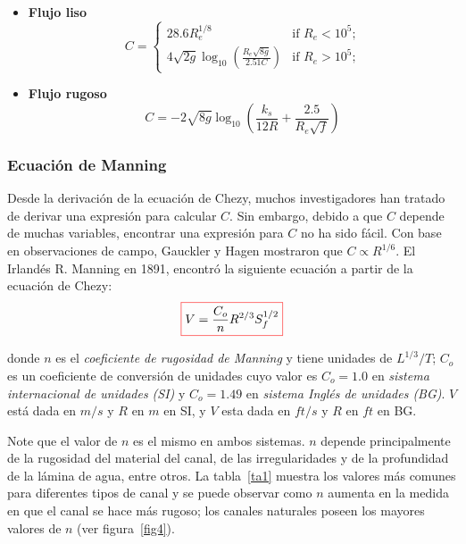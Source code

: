 \documentclass[11pt, oneside]{article}
\begin{document}
\begin{itemize}
\item \textbf{Flujo liso}
\begin{equation}
C = \begin{cases}
28.6 R_e^{1/8} & \text{if $R_e < 10^5$;}\\
4\sqrt{2g}\log_{10} \left( \frac{R_e \sqrt{8g}}{2.51 C}\right) & \text{if $R_e > 10^5$;}
\end{cases}
\label{eq14}
\end{equation}

\item \textbf{Flujo rugoso}
\begin{equation}
C = -2\sqrt{8g}\log_{10} \left(\frac{k_s}{12R} + \frac{2.5}{R_e \sqrt{f}} \right)
\label{eq15}
\end{equation}
\end{itemize}

\subsubsection{Ecuaci\'on de Manning}
Desde la derivaci\'on de la ecuaci\'on de Chezy, muchos investigadores han tratado de derivar una expresi\'on para calcular $C$. Sin embargo, debido a que $C$ depende de muchas variables, encontrar una expresión para $C$ no ha sido fácil. Con base en observaciones de campo, Gauckler y Hagen mostraron que $C \propto R^{1/6}$. El Irlandés R. Manning en 1891, encontró la siguiente ecuaci\'on a partir de la ecuaci\'on de Chezy:
\begin{equation}
\color{red}\boxed{\color{black} V = \frac{C_o }{n} R^{2/3} S_f^{1/2}}
\label{eq16}
\end{equation}

donde $n$ es el \emph{coeficiente de rugosidad de Manning} y tiene unidades de $L^{1/3} /T$; $C_o$ es un coeficiente de conversi\'on de unidades cuyo valor es $C_o = 1.0$ en \emph{sistema internacional de unidades (SI)} y $C_o = 1.49$ en \emph{sistema Ingl\'es de unidades (BG)}. $V$ est\'a dada en $m/s$ y $R$ en $m$ en SI, y $V$ esta dada en $ft/s$ y $R$ en $ft$ en BG.
 
Note que el valor de $n$ es el mismo en ambos sistemas. $n$ depende principalmente de la rugosidad del material del canal, de las irregularidades y de la profundidad de la l\'amina de agua, entre otros. La tabla~\ref{ta1} muestra los valores m\'as comunes para diferentes tipos de canal y se puede observar como $n$ aumenta en la medida en que el canal se hace m\'as rugoso; los canales naturales poseen los mayores valores de $n$ (ver figura~\ref{fig4}).   
\end{document}
